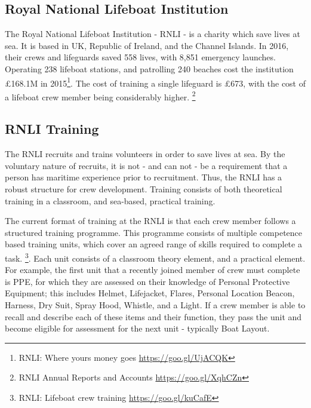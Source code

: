 \documentclass[ %
                    author={Elis Jones},
                supervisor={Dr. Kirsten Cater},
                    degree={BSc},
                     title={The Effect of Presentation Medium on Spatial Cognition},
                  subtitle={in the Virtual Environment},
                      year={2018} ]{dissertation}
\begin{document}
\subsection{Royal National Lifeboat Institution}\label{rnli-money}
The Royal National Lifeboat Institution - RNLI - is a charity which save lives at sea. It is based in UK, Republic of Ireland, and the Channel Islands. In 2016, their crews and lifeguards saved 558 lives, with 8,851 emergency launches. Operating 238 lifeboat stations, and patrolling 240 beaches cost the institution £168.1M in 2015\footnote{RNLI: Where yours money goes \url{https://goo.gl/UjACQK}}. The cost of training a single lifeguard is £673, with the cost of a lifeboat crew member being considerably higher. \footnote{ RNLI Annual Reports and Accounts \url{https://goo.gl/XqhCZn}} 



\subsection{RNLI Training} \label{rnli_training}
The RNLI recruits and trains volunteers in order to save lives at sea. By the voluntary nature of recruits, it is not - and can not - be a requirement that a person has maritime experience prior to recruitment. Thus, the RNLI has a robust structure for crew development. Training consists of both theoretical training in a classroom, and sea-based, practical training.

The current format of training at the RNLI is that each crew member follows a structured training programme. This programme consists of multiple competence based training units, which cover an agreed range of skills required to complete a task. \footnote{RNLI: Lifeboat crew training \url{https://goo.gl/kuCafE}}. Each unit consists of a classroom theory element, and a practical element. For example, the first unit that a recently joined member of crew must complete is PPE, for which they are assessed on their knowledge of Personal Protective Equipment; this includes Helmet, Lifejacket, Flares, Personal Location Beacon, Harness, Dry Suit, Spray Hood, Whistle, and a Light. If a crew member is able to recall and describe each of these items and their function, they pass the unit and become eligible for assessment for the next unit - typically Boat Layout. 
\end{document}
